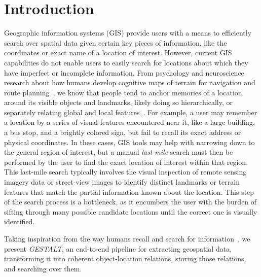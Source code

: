 \section{Introduction}
\label{section:introduction}
Geographic information systems (GIS) provide users with a means to efficiently search over spatial data given certain key pieces of information, like the coordinates or exact name of a location of interest. However, current GIS capabilities do not enable users to easily search for locations about which they have imperfect or incomplete information. From psychology and neuroscience research about how humans develop cognitive maps of terrain for navigation and route planning~\cite{Weisberg2016, Miller2013, Keatley2021, ??}, we know that people tend to anchor memories of a location around its visible objects and landmarks, likely doing so hierarchically, or separately relating global and local features~\cite{Weisberg2016}. For example, a user may remember a location by a series of visual features encountered near it, like a large building, a bus stop, and a brightly colored sign, but fail to recall its exact address or physical coordinates. In these cases, GIS tools may help with narrowing down to the general region of interest, but a manual \emph{last-mile} search must then be performed by the user to find the exact location of interest within that region. This last-mile search typically involves the visual inspection of remote sensing imagery data or street-view images to identify distinct landmarks or terrain features that match the partial information known about the location. This step of the search process is a bottleneck, as it encumbers the user with the burden of sifting through many possible candidate locations until the correct one is visually identified. 


Taking inspiration from the way humans recall and search for information~\cite{Helbing2020, Oliveira2016, Weisberg2016, ?}, we present \emph{GESTALT}, an end-to-end pipeline for extracting geospatial data, transforming it into coherent object-location relations, storing those relations, and searching over them. 

